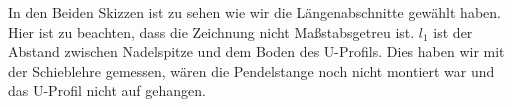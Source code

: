 \documentclass[twoside]{protokoll}
\begin{document}
\begin{figure}[H]
    \centering
    \hfill 
\end{figure}
In den Beiden Skizzen ist zu sehen wie wir die Längenabschnitte gewählt haben. 
Hier ist zu beachten, dass die Zeichnung nicht Maßstabsgetreu ist.
$l_1$ ist der Abstand zwischen Nadelspitze und dem Boden des U-Profils. 
Dies haben wir mit der Schieblehre gemessen, wären die Pendelstange noch nicht montiert war und das U-Profil nicht auf gehangen.\\
\end{document}
